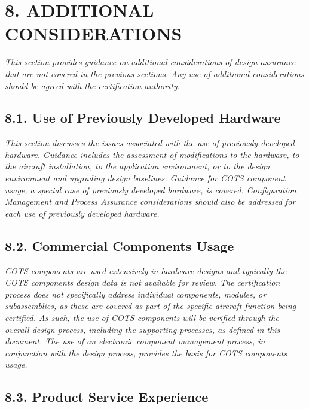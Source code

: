 \documentclass[]{article}
\begin{document}
\section{8. ADDITIONAL CONSIDERATIONS}\label{additional-considerations}

\emph{This section provides guidance on additional considerations of
design assurance that are not covered in the previous sections. Any use
of additional considerations should be agreed with the certification
authority.}

\subsection{8.1. Use of Previously Developed
Hardware}\label{use-of-previously-developed-hardware}

\emph{This section discusses the issues associated with the use of
previously developed hardware. Guidance includes the assessment of
modifications to the hardware, to the aircraft installation, to the
application environment, or to the design environment and upgrading
design baselines. Guidance for COTS component usage, a special case of
previously developed hardware, is covered. Configuration Management and
Process Assurance considerations should also be addressed for each use
of previously developed hardware.}

\subsection{8.2. Commercial Components
Usage}\label{commercial-components-usage}

\emph{COTS components are used extensively in hardware designs and
typically the COTS components design data is not available for review.
The certification process does not specifically address individual
components, modules, or subassemblies, as these are covered as part of
the specific aircraft function being certified. As such, the use of COTS
components will be verified through the overall design process,
including the supporting processes, as defined in this document. The use
of an electronic component management process, in conjunction with the
design process, provides the basis for COTS components usage.}

\subsection{8.3. Product Service
Experience}\label{product-service-experience}
\end{document}
